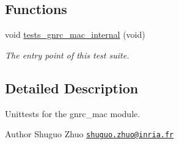 \subsection*{Functions}
\begin{DoxyCompactItemize}
\item 
void \hyperlink{group__unittests_ga4520245974f5c91b71a68215b4910126}{tests\+\_\+gnrc\+\_\+mac\+\_\+internal} (void)
\begin{DoxyCompactList}\small\item\em The entry point of this test suite. \end{DoxyCompactList}\end{DoxyCompactItemize}


\subsection{Detailed Description}
Unittests for the {\ttfamily gnrc\+\_\+mac} module. 

\begin{DoxyAuthor}{Author}
Shuguo Zhuo \href{mailto:shuguo.zhuo@inria.fr}{\tt shuguo.\+zhuo@inria.\+fr} 
\end{DoxyAuthor}
